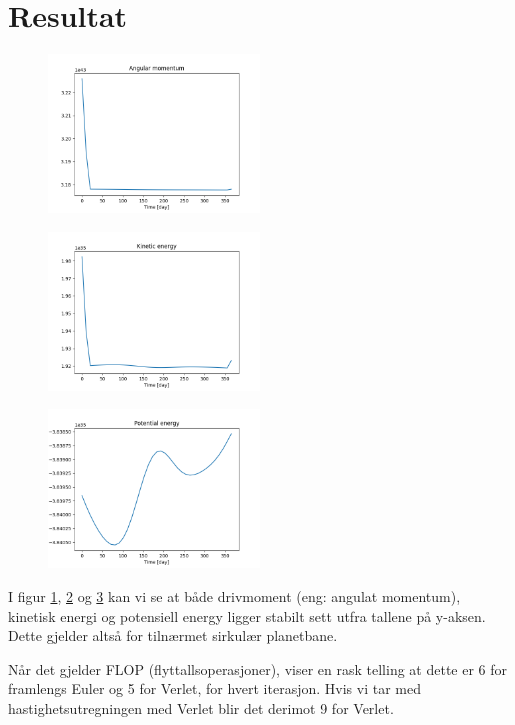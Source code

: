 \documentclass[a4paper,10pt,english]{article}
\begin{document}
\section*{Resultat}
\begin{figure}
    \includegraphics[width=0.5\textwidth]{3c_angular_momentum.png}
    \caption{}
    \label{fig:3cam}
\end{figure}
\begin{figure}
    \includegraphics[width=0.5\textwidth]{3c_kinetic_energy.png}
    \caption{}
    \label{fig:3cke}
\end{figure}
\begin{figure}
    \includegraphics[width=0.5\textwidth]{3c_potential_energy.png}
    \caption{}
    \label{fig:3cpe}
\end{figure}
I figur \ref{fig:3cam}, \ref{fig:3cke} og \ref{fig:3cpe} kan vi se at både
drivmoment (eng: angulat momentum), kinetisk energi og potensiell energy ligger
stabilt sett utfra tallene på y-aksen. Dette gjelder altså for tilnærmet
sirkulær planetbane.

Når det gjelder FLOP (flyttallsoperasjoner), viser en rask telling at dette er
6 for framlengs Euler og 5 for Verlet, for hvert iterasjon. Hvis vi tar med
hastighetsutregningen med Verlet blir det derimot 9 for Verlet.
\end{document}
